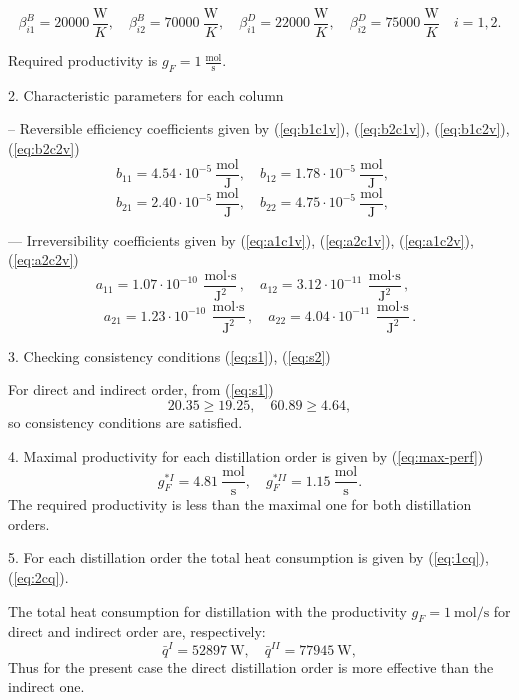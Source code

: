 \documentclass[12pt]{article}
\begin{document}
$$
\beta^B_{i1} = 20000\: \frac{\mbox{W}}{K},\quad
\beta^B_{i2} = 70000\: \frac{\mbox{W}}{K},\quad
\beta^D_{i1} = 22000\: \frac{\mbox{W}}{K},\quad
\beta^D_{i2} = 75000\: \frac{\mbox{W}}{K}\quad i=1,2.
$$

Required productivity is
$
g_F = 1\:\frac{\mbox{mol}}{\mbox{s}}.
$

2. Characteristic parameters for each column

-- Reversible efficiency coefficients given by (\ref{eq:b1c1v}), (\ref{eq:b2c1v}), (\ref{eq:b1c2v}), (\ref{eq:b2c2v})
$$
b_{11} = 4.54\cdot10^{-5}\: \frac{\mbox{mol}}{\mbox{J}},\quad
b_{12} = 1.78\cdot10^{-5}\: \frac{\mbox{mol}}{\mbox{J}},\quad
$$
$$
b_{21} = 2.40\cdot10^{-5}\: \frac{\mbox{mol}}{\mbox{J}},\quad
b_{22} = 4.75\cdot10^{-5}\: \frac{\mbox{mol}}{\mbox{J}},\quad
$$

--- Irreversibility coefficients given by (\ref{eq:a1c1v}), (\ref{eq:a2c1v}), (\ref{eq:a1c2v}), (\ref{eq:a2c2v})
$$
a_{11} = 1.07\cdot10^{-10}\: \frac{\mbox{mol}\cdot\mbox{s}}{\mbox{J}^2},\quad
a_{12} = 3.12\cdot10^{-11}\: \frac{\mbox{mol}\cdot\mbox{s}}{\mbox{J}^2},\quad
$$
$$
a_{21} = 1.23\cdot10^{-10}\: \frac{\mbox{mol}\cdot\mbox{s}}{\mbox{J}^2},\quad
a_{22} = 4.04\cdot10^{-11}\: \frac{\mbox{mol}\cdot\mbox{s}}{\mbox{J}^2}.
$$

3. Checking consistency conditions (\ref{eq:s1}), (\ref{eq:s2})

For direct and indirect order, from (\ref{eq:s1})
$$
20.35 \geq 19.25,\quad 60.89 \geq 4.64,
$$
so consistency conditions are satisfied.

4. Maximal productivity for each distillation order is given by (\ref{eq:max-perf})
$$
g_{F}^{*I} = 4.81\: \frac{\mbox{mol}}{\mbox{s}},\quad
g_{F}^{*II} = 1.15\: \frac{\mbox{mol}}{\mbox{s}}.
$$
The required productivity is less than the maximal one for both distillation orders.

5. For each distillation order the total heat consumption is given by (\ref{eq:1cq}), (\ref{eq:2cq}).

The total heat consumption for distillation with the productivity $g_F = 1\:\mbox{mol/s}$ for direct and indirect order are, respectively:
$$
\bar{q}^I = 52897\:\mbox{W},\quad \bar{q}^{II} = 77945 \:\mbox{W},
$$
Thus for the present case the direct distillation order is more effective than the indirect one.
\end{document}
